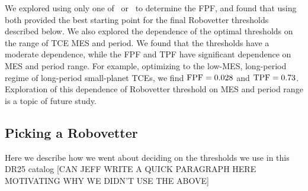 We explored using only one of \scrtce\ or \invtce\ to determine the FPF, and found that using both provided the best starting point for the final Robovetter thresholds described below.  We also explored the dependence of the optimal thresholds on the range of TCE MES and period.  We found that the thresholds have a moderate dependence, while the FPF and TPF have significant dependence on MES and period range.  For example, optimizing to the low-MES, long-period regime of long-period small-planet TCEs,  we find ${\rm FPF} = 0.028$ and ${\rm TPF} = 0.73$.  Exploration of this dependence of Robovetter threshold on MES and period range is a topic of future study.


\subsection{Picking a Robovetter}
Here we describe how we went about deciding on the thresholds we use in this DR25 catalog
[CAN JEFF WRITE A QUICK PARAGRAPH HERE MOTIVATING WHY WE DIDN'T USE THE ABOVE]\\
[DO WE WANT A TABLE OF THE EXACT THRESHOLDS STEVE FOUND?]\\
